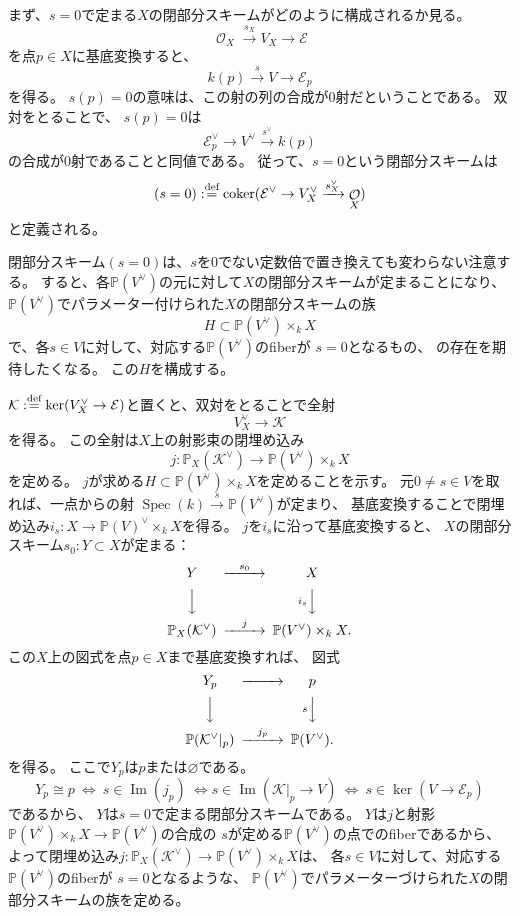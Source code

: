 \documentclass[uplatex]{jsarticle}
\theoremstyle{definition}
\DeclareMathOperator{\im}{\mathrm{Im}}
\DeclareMathOperator{\coker}{\mathrm{coker}}
\DeclareMathOperator{\Spec}{\mathrm{Spec}}
\renewcommand{\P}{\mathbb{P}}
\newcommand{\mcE}{\mathcal{E}}
\newcommand{\mcK}{\mathcal{K}}
\newcommand{\mcO}{\mathcal{O}}
\DeclareMathOperator{\OOO}{\mcO}
\newcommand{\OX}{{\OOO_X}}
\renewcommand{\emptyset}{\varnothing}
\def\dfn{:\overset{\mbox{{\scriptsize def}}}{=}}
\begin{document}
まず、\(s=0\)で定まる\(X\)の閉部分スキームがどのように構成されるか見る。
\[\OX \xrightarrow{s_X} V_X\to \mcE\]
を点\(p\in X\)に基底変換すると、
\[k(p) \xrightarrow{s} V \to \mcE_p\]
を得る。
\(s(p)=0\)の意味は、この射の列の合成が\(0\)射だということである。
双対をとることで、
\(s(p)=0\)は
\[
\mcE_p^{\vee}\to V^{\vee}\xrightarrow{s^{\vee}} k(p)
\]
の合成が\(0\)射であることと同値である。
従って、\(s=0\)という閉部分スキームは
\[
(s=0) \dfn \coker(\mcE^{\vee} \to V_X^{\vee} \xrightarrow{s^{\vee}_X} \OX)
\]
と定義される。

閉部分スキーム\((s=0)\)は、\(s\)を\(0\)でない定数倍で置き換えても変わらない注意する。
すると、各\(\P(V^{\vee})\)の元に対して\(X\)の閉部分スキームが定まることになり、
\(\P(V^{\vee})\)でパラメーター付けられた\(X\)の閉部分スキームの族
\[H\subset \P(V^{\vee})\times_kX\]
で、各\(s\in V\)に対して、対応する\(\P(V^{\vee})\)のfiberが
\(s=0\)となるもの、
の存在を期待したくなる。
この\(H\)を構成する。

\(\mcK\dfn \ker(V_X^{\vee}\to \mcE)\)と置くと、双対をとることで全射
\[
V_X^{\vee}\to \mcK
\]
を得る。
この全射は\(X\)上の射影束の閉埋め込み
\[
j:\P_X(\mcK^{\vee})\to \P(V^{\vee})\times_kX
\]
を定める。
\(j\)が求める\(H\subset \P(V^{\vee})\times_kX\)を定めることを示す。
元\(0\neq s\in V\)を取れば、一点からの射
\(\Spec(k)\xrightarrow{s} \P(V^{\vee})\)が定まり、
基底変換することで閉埋め込み\(i_s:X\to \P(V)^{\vee}\times_kX\)を得る。
\(j\)を\(i_s\)に沿って基底変換すると、
\(X\)の閉部分スキーム\(s_0:Y\subset X\)が定まる：
\[
\begin{CD}
  Y @>s_0>> X \\
  @VVV @Vi_sVV \\
\P_X(\mcK^{\vee}) @>j>> \P(V^{\vee})\times_kX.
\end{CD}
\]
この\(X\)上の図式を点\(p\in X\)まで基底変換すれば、
図式
\[
\begin{CD}
  Y_p @>>> p \\
  @VVV @VsVV \\
  \P(\mcK^{\vee}|_p) @>j_p>> \P(V^{\vee}).
\end{CD}
\]
を得る。
ここで\(Y_p\)は\(p\)または\(\emptyset\)である。
\[
Y_p\cong p \ \iff \ s\in \im(j_p) \ \iff s\in \im (\mcK|_p\to V) \
\iff \ s\in \ker(V\to \mcE_p)
\]
であるから、
\(Y\)は\(s=0\)で定まる閉部分スキームである。
\(Y\)は\(j\)と射影\(\P(V^{\vee})\times_kX\to \P(V^{\vee})\)の合成の
\(s\)が定める\(\P(V^{\vee})\)の点でのfiberであるから、
よって閉埋め込み\(j:\P_X(\mcK^{\vee})\to \P(V^{\vee})\times_kX\)は、
各\(s\in V\)に対して、対応する\(\P(V^{\vee})\)のfiberが
\(s=0\)となるような、
\(\P(V^{\vee})\)でパラメーターづけられた\(X\)の閉部分スキームの族を定める。
\end{document}
